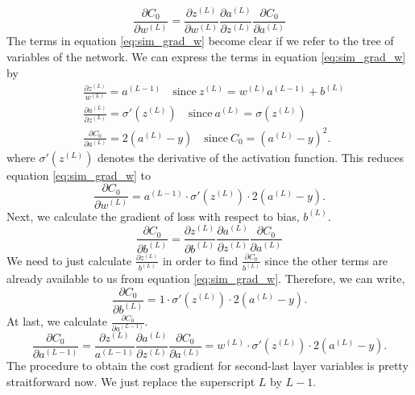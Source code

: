 \begin{equation}
    \label{eq:sim_grad_w}
    \frac{\partial C_0}{\partial w^{(L)}} = \frac{\partial z^{(L)}}{\partial w^{(L)}} \frac{\partial a^{(L)}}{\partial z^{(L)}} \frac{\partial C_0}{\partial a^{(L)}}
\end{equation}
The terms in equation \eqref{eq:sim_grad_w} become clear if we refer to the tree of variables of the network. We can express the terms in equation \eqref{eq:sim_grad_w} by
\begin{equation*}
    \begin{aligned}
        & \frac{\partial z^{(L)}}{w^{(L)}} = a^{(L-1)} \quad \text{since} \ z^{(L)} = w^{(L)} a^{(L-1)} + b^{(L)}\\
        & \frac{\partial a^{(L)}}{\partial z^{(L)}} = \sigma'(z^{(L)}) \quad \text{since} \ a^{(L)} = \sigma (z^{(L)})\\
        & \frac{\partial C_0}{\partial a^{(L)}} = 2 (a^{(L)} - y) \quad \text{since} \ C_0 = (a^{(L)} - y)^2.
    \end{aligned}
\end{equation*}
where $\sigma'(z^{(L)})$ denotes the derivative of the activation function. This reduces equation \eqref{eq:sim_grad_w} to 
\begin{equation}
    \label{eq:del_w}
    \frac{\partial C_0}{\partial w^{(L)}} = a^{(L-1)} \cdot \sigma'(z^{(L)}) \cdot 2(a^{(L)} -y). 
\end{equation}
Next, we calculate the gradient of loss with respect to bias, $b^{(L)}$. 
$$\frac{\partial C_0}{\partial b^{(L)}} = \frac{\partial z^{(L)}}{\partial b^{(L)}} \frac{\partial a^{(L)}}{\partial z^{(L)}} \frac{\partial C_0}{\partial a^{(L)}}$$
We need to just calculate $\frac{\partial z^{(L)}}{b^{(L)}}$ in order to find $\frac{\partial C_0}{b^{(L)}}$ since the other terms are already available to us from equation \eqref{eq:sim_grad_w}. Therefore, we can write, 
\begin{equation}
    \label{del_b}
    \frac{\partial C_0}{\partial b^{(L)}} = 1 \cdot \sigma'(z^{(L)}) \cdot 2(a^{(L)} -y).
\end{equation}
At last, we calculate $\frac{\partial C_0}{\partial a^{(L-1)}}$. 
\begin{equation}
    \label{eq:del_a}
    \frac{\partial C_0}{\partial a^{(L-1)}} = \frac{\partial z^{(L)}}{a^{(L-1)}} \frac{\partial a^{(L)}}{\partial z^{(L)}} \frac{\partial C_0}{\partial a^{(L)}} = w^{(L)}\cdot\sigma'(z^{(L)}) \cdot 2(a^{(L)} -y).
\end{equation}
The procedure to obtain the cost gradient for second-last layer variables is pretty straitforward now. We just replace the superscript $L$ by $L-1$. 
